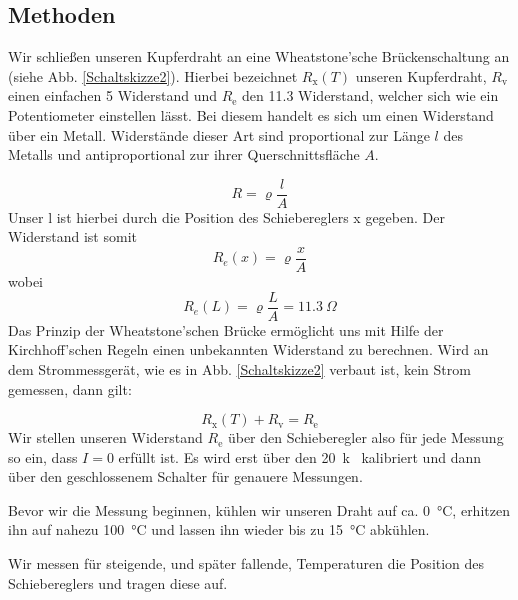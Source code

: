 \documentclass[11pt,a4paper,titlepage, ngerman]{article}
\begin{document}
		\subsection{Methoden} 
		
			Wir schließen unseren Kupferdraht an eine Wheatstone'sche Brückenschaltung an (siehe Abb. \ref{Schaltskizze2}). Hierbei bezeichnet $R_\text{x}(T)$ unseren Kupferdraht, $R_\text{v}$ einen einfachen \SI{5}{\Omega} Widerstand und $R_\text{e}$ den \SI{11,3}{\Omega} Widerstand, welcher sich wie ein Potentiometer einstellen lässt. Bei diesem handelt es sich um einen Widerstand über ein Metall. Widerstände dieser Art sind proportional zur Länge $l$ des Metalls und antiproportional zur ihrer Querschnittsfläche $A$. 
			
			\begin{equation*}
				R = \varrho \frac{l}{A} 
			\end{equation*}				
			Unser l ist hierbei durch die Position des Schiebereglers x gegeben. Der Widerstand ist somit
			\begin{equation*}
			R_e(x) = \varrho \frac{x}{A}
			\end{equation*}
			wobei
			\begin{equation*}
			R_e(L) = \varrho \frac{L}{A} = \SI{11,3}{\Omega}
			\end{equation*}		
			Das Prinzip der Wheatstone'schen Brücke ermöglicht uns mit Hilfe der Kirchhoff'schen Regeln einen unbekannten Widerstand zu berechnen.
			Wird an dem Strommessgerät, wie es in Abb. \ref{Schaltskizze2} verbaut ist, kein Strom gemessen, dann gilt:
			
			\begin{equation*}
				R_\text{x}(T) + R_\text{v} =  R_\text{e}
			\end{equation*}
			Wir stellen unseren Widerstand $R_\text{e}$ über den Schieberegler also für jede Messung so ein, dass $I = 0$ erfüllt ist. Es wird erst über den \SI{20}{k\Omega} kalibriert und dann über den geschlossenem Schalter für genauere Messungen.
			
			Bevor wir die Messung beginnen, kühlen wir unseren Draht auf ca. \SI{0}{\celsius}, erhitzen ihn auf nahezu \SI{100}{\celsius} und lassen ihn wieder bis zu \SI{15}{\celsius} abkühlen.
			
			Wir messen für steigende, und später fallende, Temperaturen die Position des Schiebereglers und tragen diese auf.
						
\end{document}
